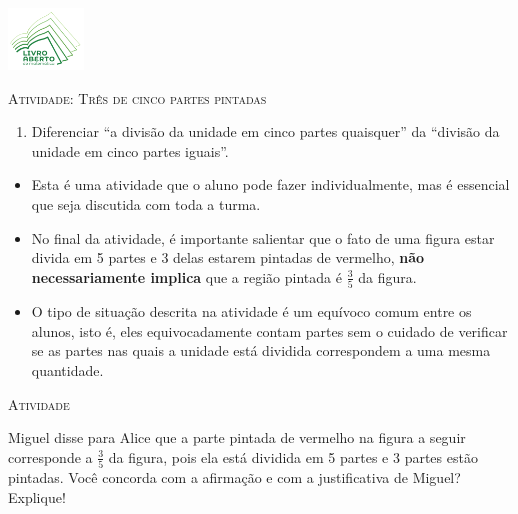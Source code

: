 \documentclass[10 pt,usenames,dvipsnames, oneside]{article}
\begin{document}
\begin{center}
  \begin{minipage}[l]{3cm}
\includegraphics[width=2cm]{../../../Figuras/logo}       
\end{minipage}\hfill
\begin{minipage}[r]{.8\textwidth}
 {\Large \scshape Atividade: Três de cinco partes pintadas}  
\end{minipage}
\end{center}
\vspace{.2cm}

\ifdefined\prof
\begin{goals}
\begin{enumerate}

    \item Diferenciar ``a divisão da unidade em cinco partes quaisquer'' da ``divisão da unidade em cinco partes iguais''.

\end{enumerate}
\tcblower

\begin{itemize} %
    \item       Esta é uma atividade que o aluno pode fazer individualmente, mas é essencial que seja discutida com toda a turma.
    \item       No final da atividade, é importante salientar que o fato de  uma figura estar divida em 5 partes e 3 delas estarem pintadas de vermelho,       {\bf não necessariamente implica}       que a região pintada é       $\frac{3}{5}$ da figura.
    \item       O tipo de situação descrita na atividade é um equívoco comum entre os alunos, isto é, eles equivocadamente contam partes sem o cuidado de verificar se as partes nas quais a unidade está dividida correspondem a uma mesma quantidade.
\end{itemize} %

\end{goals}

\bigskip
\begin{center}
{\large \scshape Atividade}
\end{center}
\fi

Miguel disse para Alice que a parte pintada de vermelho na figura a seguir corresponde a $\frac{3}{5}$ da figura, pois ela está dividida em 5 partes e 3 partes estão pintadas. Você concorda com a afirmação e com a justificativa de Miguel? Explique!
\end{document}
